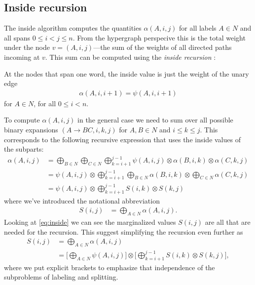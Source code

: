 \subsection{Inside recursion}
  The inside algorithm computes the quantities $\alpha(A,i,j)$ for all labels $A \in N$ and all spans $0 \leq i < j \leq n$. From the hypergraph perspecive this is the total weight under the node $v = (A, i, j)$---the sum of the weights of all directed paths incoming at $v$. This sum can be computed using the \textit{inside recursion} \citep{goodman1999semiring}:

  At the nodes that span one word, the inside value is just the weight of the unary edge
  \begin{align}
      \label{eq:inside-base}
      \alpha(A, i, i+1) = \psi(A, i, i+1)
  \end{align}
  for $A \in N$, for all $0 \leq i < n$.

  To compute $\alpha(A, i, j)$ in the general case we need to sum over all possible binary expansions $(A \to B C, i, k, j)$ for $A, B \in N$ and $i \leq k \leq j$. This corresponds to the following recursive expression that uses the inside values of the subparts:
  \begin{align*}
  \label{eq:inside}
    \alpha(A, i, j)
      &= \bigoplus_{B \in N} \bigoplus_{C \in N} \bigoplus_{k=i+1}^{j-1} \psi(A, i, j) \otimes \alpha(B,i,k) \otimes \alpha(C,k,j) \\
      &= \psi(A, i, j) \otimes \bigoplus_{k=i+1}^{j-1} \bigoplus_{B \in N} \alpha(B,i,k) \otimes \bigoplus_{C \in N} \alpha(C,k,j) \\
      &= \psi(A, i, j) \otimes \bigoplus_{k=i+1}^{j-1} S(i,k) \otimes S(k,j)
  \end{align*}
  where we've introduced the notational abbreviation
  \begin{align*}
      S(i,j) &= \bigoplus_{A \in N} \alpha(A,i,j).
  \end{align*}
  Looking at \ref{eq:inside} we can see the marginalized values $S(i, j)$ are all that are needed for the recursion. This suggest simplifying the recursion even further as
  \begin{align*}
  \label{eq:inside-simplified}
    S(i, j)
      &= \bigoplus_{A \in N} \alpha(A,i,j) \\
      &= \Bigg[ \bigoplus_{A \in N} \psi(A, i, j) \Bigg] \otimes \Bigg[\bigoplus_{k=i+1}^{j-1} S(i,k) \otimes  S(k,j) \Bigg],
  \end{align*}
  where we put explicit brackets to emphasize that independence of the subproblems of labeling and splitting.

